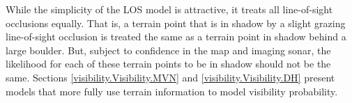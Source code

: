 While the simplicity of the LOS model is attractive, it treats all line-of-sight occlusions equally.  That is, a terrain point that is in shadow by a slight grazing line-of-sight occlusion is treated the same as a terrain point in shadow behind a large boulder.  But, subject to confidence in the map and imaging sonar, the likelihood for each of these terrain points to be in shadow should not be the same.  Sections \ref{visibility.Visibility.MVN} and \ref{visibility.Visibility.DH} present models that more fully use terrain information to model visibility probability.

%
%
%
%
%

